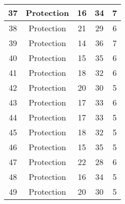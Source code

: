 \documentclass[results.tex]{subfiles}
\begin{document}
\begin{center}
\begin{tabular}{| c || c | c | c | c |}
            \hline
            37                      & Protection                   & 16                     & 34                      & 7                    \\
            \hline
            38                      & Protection                   & 21                     & 29                      & 6                    \\
            \hline
            39                      & Protection                   & 14                     & 36                      & 7                    \\
            \hline
            40                      & Protection                   & 15                     & 35                      & 6                    \\
            \hline
            41                      & Protection                   & 18                     & 32                      & 6                    \\
            \hline
            42                      & Protection                   & 20                     & 30                      & 5                    \\
            \hline
            43                      & Protection                   & 17                     & 33                      & 6                    \\
            \hline
            44                      & Protection                   & 17                     & 33                      & 5                    \\
            \hline
            45                      & Protection                   & 18                     & 32                      & 5                    \\
            \hline
            46                      & Protection                   & 15                     & 35                      & 5                    \\
            \hline
            47                      & Protection                   & 22                     & 28                      & 6                    \\
            \hline
            48                      & Protection                   & 16                     & 34                      & 5                    \\
            \hline
            49                      & Protection                   & 20                     & 30                      & 5                    \\
            \hline
        \end{tabular}
    \end{center}
\end{document}
